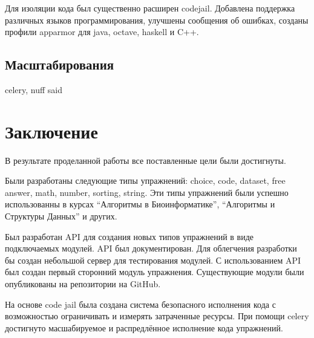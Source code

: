\documentclass{matmex-diploma-custom}
\begin{document}
Для изоляции кода был существенно расширен codejail. Добавлена
поддержка различных языков программирования, улучшены сообщения об
ошибках, созданы профили apparmor для java, octave, haskell и C++.

\subsection{Масштабирования}
celery, nuff said

\section*{Заключение}
В результате проделанной работы все поставленные цели были
достигнуты.

Были разработаны следующие типы упражнений: choice, code, dataset,
free answer, math, number, sorting, string. Эти типы упражнений были
успешно использованны в курсах ``Алгоритмы в Биоинформатике'',
``Алгоритмы и Структуры Данных'' и других.

Был разработан API для создания новых типов упражнений в виде
подключаемых модулей. API был документирован. Для облегчения
разработки бы создан небольшой сервер для тестирования модулей. С
использованием API был создан первый сторонний модуль
упражнения. Существующие модули были опубликованы на репозитории на
GitHub.

На основе code jail была создана система безопасного исполнения кода с
возможностью ограничивать и измерять затраченные ресурсы. При помощи
celery достигнуто масшабируемое и распредлённое исполнение кода упражнений.
\nocite{stepic}
\nocite{plugins:doc}
\nocite{plugins:repo}



\end{document}
